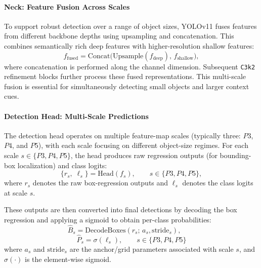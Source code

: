 \documentclass[conference]{IEEEtran}
\begin{document}
\paragraph{Neck: Feature Fusion Across Scales}
To support robust detection over a range of object sizes, YOLOv11 fuses features from different backbone depths using upsampling and concatenation. This combines semantically rich deep features with higher-resolution shallow features:
\begin{equation}
f_{\text{fused}} = \mathrm{Concat}\big(\mathrm{Upsample}(f_{\text{deep}}),\, f_{\text{shallow}}\big),
\end{equation}
where concatenation is performed along the channel dimension. Subsequent \texttt{C3k2} refinement blocks further process these fused representations. This multi-scale fusion is essential for simultaneously detecting small objects and larger context cues.

\paragraph{Detection Head: Multi-Scale Predictions}
The detection head operates on multiple feature-map scales (typically three: $P3$, $P4$, and $P5$), with each scale focusing on different object-size regimes. For each scale $s \in \{P3, P4, P5\}$, the head produces raw regression outputs (for bounding-box localization) and class logits:
\begin{equation}
\{r_s,\; \ell_s\} = \mathrm{Head}(f_s), \qquad s \in \{P3, P4, P5\},
\end{equation}
where $r_s$ denotes the raw box-regression outputs and $\ell_s$ denotes the class logits at scale $s$.

These outputs are then converted into final detections by decoding the box regression and applying a sigmoid to obtain per-class probabilities:
\begin{equation}
\hat{B}_s = \mathrm{DecodeBoxes}(r_s;\, a_s, \mathrm{stride}_s),
\qquad
\end{equation}
\begin{equation}
\hat{P}_s = \sigma(\ell_s),
\qquad s \in \{P3, P4, P5\}
\end{equation}
where $a_s$ and $\mathrm{stride}_s$ are the anchor/grid parameters associated with scale $s$, and $\sigma(\cdot)$ is the element-wise sigmoid.

\end{document}
